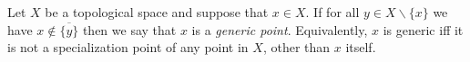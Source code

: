 \documentclass[12pt]{article}
\begin{document}
Let $X$ be a topological space and suppose that $x\in X$. If for all $y\in X\backslash\{x\}$ we have $x\not\in\overline{\{y\}}$ then we say that $x$ is a \emph{generic point}.  Equivalently, $x$ is generic iff it is not a specialization point of any point in $X$, other than $x$ itself.
\end{document}
